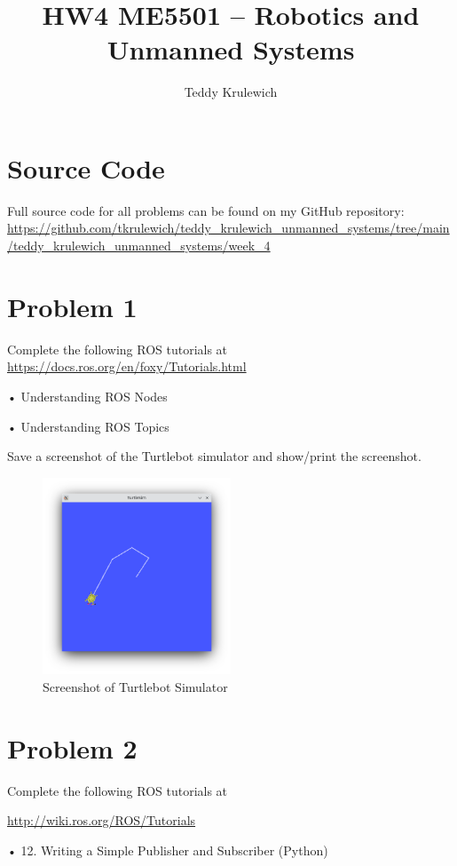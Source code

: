 \documentclass{article}
\author{Teddy Krulewich}
\title{\vspace{-4em}HW4 ME5501 – Robotics and Unmanned Systems}
\begin{document}
\maketitle

\section*{Source Code}

Full source code for all problems can be found on my GitHub repository:
\url{https://github.com/tkrulewich/teddy_krulewich_unmanned_systems/tree/main/teddy_krulewich_unmanned_systems/week_4}

\section*{Problem 1}
Complete the following ROS tutorials at \url{https://docs.ros.org/en/foxy/Tutorials.html}

• Understanding ROS Nodes

• Understanding ROS Topics

\bigskip
\noindent Save a screenshot of the Turtlebot simulator and show/print the screenshot.


\begin{figure}[H]
  \centering
  \includegraphics[width=0.5\textwidth]{question1.png}
  \caption*{Screenshot of Turtlebot Simulator}
\end{figure}

\section*{Problem 2}

Complete the following ROS tutorials at

\url{http://wiki.ros.org/ROS/Tutorials}


• 12. Writing a Simple Publisher and Subscriber (Python) 
\end{document}
